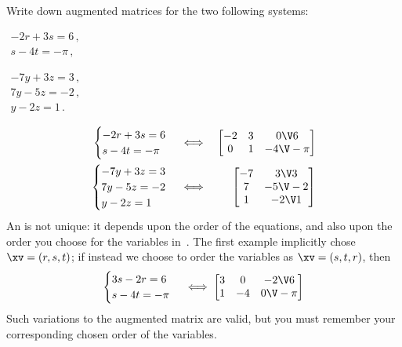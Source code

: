 \begin{example} 
Write down augmented matrices for the two following systems:
\begin{Parts}
\item \(\begin{array}{l} -2r+3s=6\,,\\s-4t=-\pi\,, \end{array}\)
\item \(\begin{array}{l}
-7y+3z=3\,,\\7y-5z=-2\,,\\y-2z=1\,.
\end{array}\)
\end{Parts}
\begin{solution} 
\begin{eqnarray*}
\begin{cases} -2r+3s=6\\s-4t=-\pi \end{cases}
&\iff&%
\begin{bmatrix} -2&3&0\V6\\ 0&1&-4\V-\pi \end{bmatrix}
\\
\begin{cases}
-7y+3z=3\\7y-5z=-2\\y-2z=1
\end{cases}
&\iff&%
\begin{bmatrix} -7&3\V3\\ 7&-5\V-2\\1&-2\V1 \end{bmatrix}
\end{eqnarray*} 
An  is not unique: it depends upon the order of the equations, and also upon the order you choose for the variables in~\xv.  
The first example implicitly chose \(\xv=(r,s,t)\); if instead we choose to order the variables as \(\xv=(s,t,r)\), then  
\begin{equation*}
\begin{cases} 3s-2r=6\\s-4t=-\pi \end{cases}
\iff%
\begin{bmatrix} 3&0&-2\V6\\ 1&-4&0\V-\pi \end{bmatrix}
\end{equation*} 
Such variations to the augmented matrix are valid, but you must remember your corresponding chosen order of the variables.
\end{solution}
\end{example}

